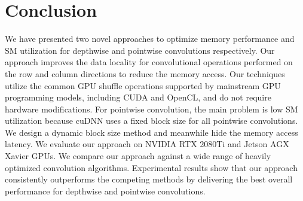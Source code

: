 \section{Conclusion}
We have presented two novel approaches to optimize memory performance and SM utilization for depthwise and pointwise convolutions respectively. 
Our approach improves the data locality for convolutional operations performed on the row and column directions to reduce the memory access. 
Our techniques utilize the common GPU shuffle operations supported by mainstream GPU programming models, including CUDA and OpenCL, and do not require hardware modifications.
For pointwise convolution, the main problem is low SM utilization because cuDNN uses a fixed block size for all pointwise convolutions. We design a dynamic block size method and meanwhile hide the memory access latency. 
We evaluate our approach on NVIDIA RTX 2080Ti and Jetson AGX Xavier GPUs. 
We compare our approach against a wide range of heavily optimized convolution algorithms. 
Experimental results show that our approach consistently outperforms the competing methods by delivering the best overall performance for depthwise and pointwise convolutions.




